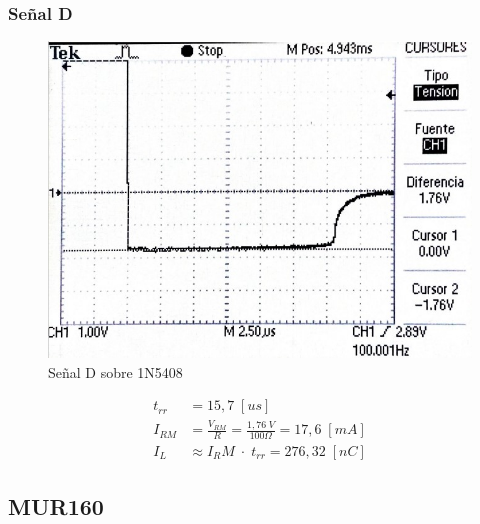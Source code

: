 \documentclass{article}
\begin{document}
\subsubsection{Señal D}
\begin{figure}[h!]
 \begin{center}
	\includegraphics[scale=0.5]{imagenes/1N5408_D.jpg} 
	\caption{Señal D sobre 1N5408}
 \end{center}
\end{figure}
%
\begin{align*}
	t_{rr} &= 15,7 \; [us] \\
	I_{RM}	&= \frac{V_{RM}}{R} = \frac{1,76 \; V}{100 \Omega} = 17,6 \; [mA] \\
	I_L	&\approx {I_RM} \; \cdot \; t_{rr} = 276,32 \; [nC]
\end{align*}
%
\subsection{MUR160}
\end{document}
